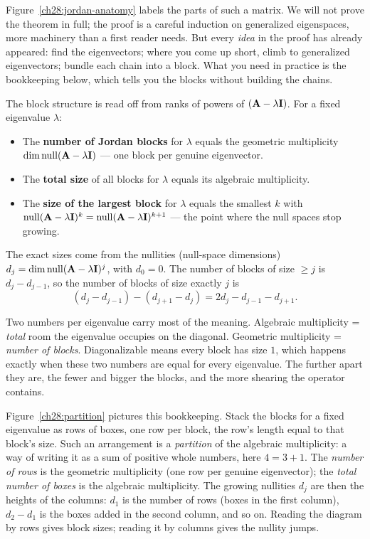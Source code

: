 Figure~\ref{ch28:jordan-anatomy} labels the parts of such a matrix. We will not prove
the theorem in full; the proof is a careful induction on generalized eigenspaces, more
machinery than a first reader needs. But every \emph{idea} in the proof has already
appeared: find the eigenvectors; where you come up short, climb to generalized
eigenvectors; bundle each chain into a block. What you need in practice is the
bookkeeping below, which tells you the blocks without building the chains.

\begin{formalbox}
The block structure is read off from ranks of powers of $(\mathbf{A}-\lambda\mathbf{I})$. For
a fixed eigenvalue $\lambda$:
\begin{itemize}
\item The \textbf{number of Jordan blocks} for $\lambda$ equals the geometric
  multiplicity $\operatorname{dim}\operatorname{null}(\mathbf{A}-\lambda\mathbf{I})$ --- one block per genuine
  eigenvector.
\item The \textbf{total size} of all blocks for $\lambda$ equals its algebraic
  multiplicity.
\item The \textbf{size of the largest block} for $\lambda$ equals the smallest $k$ with
  $\operatorname{null}(\mathbf{A}-\lambda\mathbf{I})^k=\operatorname{null}(\mathbf{A}-\lambda\mathbf{I})^{k+1}$ --- the point
  where the null spaces stop growing.
\end{itemize}
The exact sizes come from the nullities (null-space dimensions)
$d_j=\operatorname{dim}\operatorname{null}(\mathbf{A}-\lambda\mathbf{I})^j$, with $d_0=0$. The number of blocks of size
$\ge j$ is $d_j-d_{j-1}$, so the number of blocks of size exactly $j$ is
\[
(d_j-d_{j-1})-(d_{j+1}-d_j) = 2d_j - d_{j-1} - d_{j+1}.
\]
\end{formalbox}

\begin{focusbox}
Two numbers per eigenvalue carry most of the meaning. Algebraic multiplicity =
\emph{total} room the eigenvalue occupies on the diagonal. Geometric multiplicity =
\emph{number of blocks}. Diagonalizable means every block has size $1$, which happens
exactly when these two numbers are equal for every eigenvalue. The further apart they
are, the fewer and bigger the blocks, and the more shearing the operator contains.
\end{focusbox}

Figure~\ref{ch28:partition} pictures this bookkeeping. Stack the blocks for a fixed
eigenvalue as rows of boxes, one row per block, the row's length equal to that block's
size. Such an arrangement is a \emph{partition} of the algebraic multiplicity: a way of
writing it as a sum of positive whole numbers, here $4=3+1$. The \emph{number of rows} is the geometric multiplicity (one row per genuine
eigenvector); the \emph{total number of boxes} is the algebraic multiplicity. The growing
nullities $d_j$ are then the heights of the columns: $d_1$ is the number of rows
(boxes in the first column), $d_2-d_1$ is the boxes added in the second column, and so on.
Reading the diagram by rows gives block sizes; reading it by columns gives the nullity
jumps.


